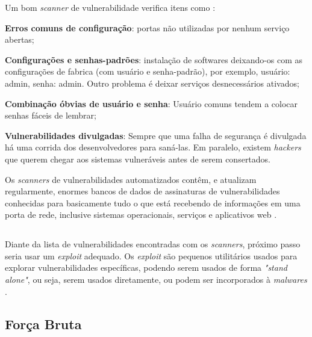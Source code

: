Um bom \textit{scanner} de vulnerabilidade verifica itens como \cite{univhacker}: 

\begin{alineas}
\item \textbf{Erros comuns de configuração}: portas não utilizadas por nenhum serviço abertas;
\item \textbf{Configurações e senhas-padrões}: instalação de softwares deixando-os com as configurações de fabrica (com usuário e senha-padrão), por exemplo, usuário: admin, senha: admin. Outro problema é deixar serviços desnecessários ativados;
\item \textbf{Combinação óbvias de usuário e senha}: Usuário comuns tendem a colocar senhas fáceis de lembrar;
\item \textbf{Vulnerabilidades divulgadas}: Sempre que uma falha de segurança é divulgada há uma corrida dos desenvolvedores para saná-las. Em paralelo, existem \textit{hackers} que querem chegar aos sistemas vulneráveis antes de serem consertados.
\end{alineas}

Os \textit{scanners} de vulnerabilidades automatizados contêm, e atualizam regularmente, enormes bancos de dados de assinaturas de vulnerabilidades conhecidas para basicamente tudo o que está recebendo de informações em uma porta de rede, inclusive sistemas operacionais, serviços e aplicativos web \cite{hackers:stuart-joel}. 


\subsection{} \label{sec:exploit}

Diante da lista de vulnerabilidades encontradas com os \textit{scanners}, próximo passo seria usar um \textit{exploit} adequado. Os \textit{exploit} são pequenos utilitários usados para explorar vulnerabilidades específicas, podendo serem usados de forma \textit{"stand alone"}, ou seja, serem usados diretamente, ou podem ser incorporados à \textit{malwares} \cite{exploit:cassio}.

\subsection{Força Bruta} \label{sec:forçabruta}

